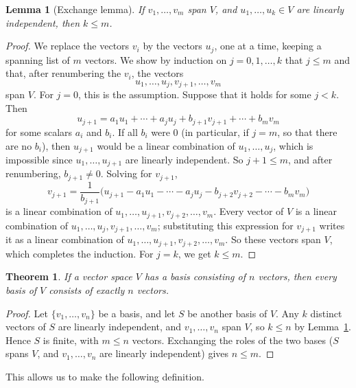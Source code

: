 \documentclass[11pt]{article}
\theoremstyle{definition}
\theoremstyle{plain}
\newtheorem{theorem}[definition]{Theorem}
\newtheorem{lemma}[definition]{Lemma}
\theoremstyle{remark}
\begin{document}
\begin{lemma}[Exchange lemma]\label{lem:exchange}
    If $v_1, \ldots, v_m$ span $V$, and $u_1, \ldots, u_k \in V$ are linearly independent, then $k \leq m$.
\end{lemma}

\begin{proof}
    We replace the vectors $v_i$ by the vectors $u_j$, one at a time, keeping a spanning list of $m$ vectors. We show by induction on $j = 0, 1, \ldots, k$ that $j \leq m$ and that, after renumbering the $v_i$, the vectors
    \[u_1, \ldots, u_j, v_{j+1}, \ldots, v_m\]
    span $V$. For $j = 0$, this is the assumption. Suppose that it holds for some $j < k$. Then
    \[u_{j+1} = a_1 u_1 + \cdots + a_j u_j + b_{j+1} v_{j+1} + \cdots + b_m v_m\]
    for some scalars $a_i$ and $b_i$. If all $b_i$ were $0$ (in particular, if $j = m$, so that there are no $b_i$), then $u_{j+1}$ would be a linear combination of $u_1, \ldots, u_j$, which is impossible since $u_1, \ldots, u_{j+1}$ are linearly independent. So $j + 1 \leq m$, and after renumbering, $b_{j+1} \neq 0$. Solving for $v_{j+1}$,
    \[v_{j+1} = \frac{1}{b_{j+1}}\Big(u_{j+1} - a_1 u_1 - \cdots - a_j u_j - b_{j+2} v_{j+2} - \cdots - b_m v_m\Big)\]
    is a linear combination of $u_1, \ldots, u_{j+1}, v_{j+2}, \ldots, v_m$. Every vector of $V$ is a linear combination of $u_1, \ldots, u_j, v_{j+1}, \ldots, v_m$; substituting this expression for $v_{j+1}$ writes it as a linear combination of $u_1, \ldots, u_{j+1}, v_{j+2}, \ldots, v_m$. So these vectors span $V$, which completes the induction. For $j = k$, we get $k \leq m$.
\end{proof}

\begin{theorem}\label{thm:basis-size}
    If a vector space $V$ has a basis consisting of $n$ vectors, then every basis of $V$ consists of exactly $n$ vectors.
\end{theorem}

\begin{proof}
    Let $\{v_1, \ldots, v_n\}$ be a basis, and let $S$ be another basis of $V$. Any $k$ distinct vectors of $S$ are linearly independent, and $v_1, \ldots, v_n$ span $V$, so $k \leq n$ by Lemma~\ref{lem:exchange}. Hence $S$ is finite, with $m \leq n$ vectors. Exchanging the roles of the two bases ($S$ spans $V$, and $v_1, \ldots, v_n$ are linearly independent) gives $n \leq m$.
\end{proof}

This allows us to make the following definition.
\end{document}

